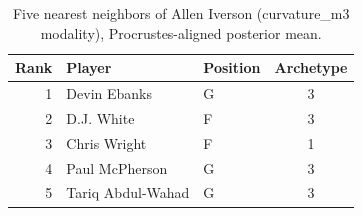 \begin{table}[htbp]
  \centering\small
  \begin{tabular}{rllc}
    \toprule
    Rank & Player & Position & Archetype \\
    \midrule
    1 & Devin Ebanks & G & 3 \\
    2 & D.J. White & F & 3 \\
    3 & Chris Wright & F & 1 \\
    4 & Paul McPherson & G & 3 \\
    5 & Tariq Abdul-Wahad & G & 3 \\
    \bottomrule
  \end{tabular}
  \caption{Five nearest neighbors of Allen Iverson (curvature_m3 modality), Procrustes-aligned posterior mean.}
  \label{tab:Allen_Iverson_neighbors_curvature_m3}
\end{table}

